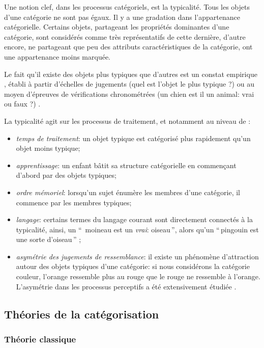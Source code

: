 Une notion clef, dans les processus catégoriels, est la typicalité. Tous les objets d'une catégorie ne sont pas égaux. Il y a une gradation dans l'appartenance catégorielle. Certains objets, partageant les propriétés dominantes d'une catégorie, sont considérés comme très représentatifs de cette dernière, d'autre encore, ne partageant que peu des attributs caractéristiques de la catégorie, ont une appartenance moins marquée.

Le fait qu'il existe des objets plus typiques que d'autres est un constat empirique \citep[p. 37]{rosch1978cognition,mervis1981categorization}, établi à partir d'échelles de jugements (quel est l'objet le plus typique ?) ou au moyen d'épreuves de vérifications chronométrées (un chien est il un animal: vrai ou faux ?) \citep[p. 41]{dubois1991semantique}.

La typicalité agit sur les processus de traitement, et notamment au niveau de \citep[p. 51]{Houix03f,mervis1981categorization}:

\begin{itemize}
\item \emph{temps de traitement}: un objet typique est catégorisé plus rapidement qu'un objet moins typique;
\item \emph{apprentissage}: un enfant bâtit sa structure catégorielle en commençant d'abord par des objets typiques;
\item \emph{ordre mémoriel}: lorsqu'un sujet énumère les membres d'une catégorie, il commence par les membres typiques;
\item \emph{langage}: certains termes du langage courant sont directement connectés à la typicalité, ainsi, un ``\, moineau est un \emph{vrai}: oiseau\,'', alors qu'un ``\,pingouin est une sorte d'oiseau\,'' \citep{mervis1981categorization};
\item \emph{asymétrie des jugements de ressemblance}: il existe un phénomène d'attraction autour des objets typiques d'une catégorie: si nous considérons la catégorie couleur, l’orange ressemble plus au rouge que le rouge ne ressemble à l'orange. L'asymétrie dans les processus perceptifs a été extensivement étudiée \citep{tversky1977features,krumhansl1978concerning}.
\end{itemize}


\subsection{Théories de la catégorisation}

\subsubsection{Théorie classique}

